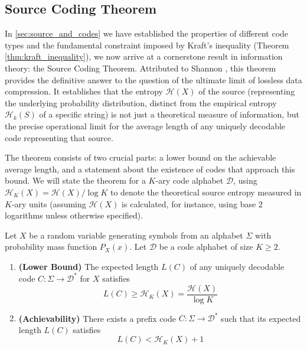 \subsection{Source Coding Theorem}

\noindent In \autoref{sec:source_and_codes} we have established the properties of different code types and the fundamental constraint imposed by Kraft's inequality (Theorem \autoref{thm:kraft_inequality}), we now arrive at a cornerstone result in information theory: the Source Coding Theorem. Attributed to Shannon \cite{Shannon1948}, this theorem provides the definitive answer to the question of the ultimate limit of lossless data compression. It establishes that the entropy $\mathcal{H}(X)$ of the source (representing the underlying probability distribution, distinct from the empirical entropy $\mathcal{H}_k(S)$ of a specific string) is not just a theoretical measure of information, but the precise operational limit for the average length of any uniquely decodable code representing that source.

\noindent The theorem consists of two crucial parts: a lower bound on the achievable average length, and a statement about the existence of codes that approach this bound. We will state the theorem for a $K$-ary code alphabet $\mathcal{D}$, using $\mathcal{H}_K(X) = \mathcal{H}(X) / \log K$ to denote the theoretical source entropy measured in $K$-ary units (assuming $\mathcal{H}(X)$ is calculated, for instance, using base 2 logarithms unless otherwise specified).

\begin{theorem}\label{thm:source_coding_theorem}
    Let $X$ be a random variable generating symbols from an alphabet $\Sigma$ with probability mass function $P_X(x)$. Let $\mathcal{D}$ be a code alphabet of size $K \ge 2$.
    \begin{enumerate}
        \item \textbf{(Lower Bound)} The expected length $L(C)$ of any uniquely decodable code $C: \Sigma \to \mathcal{D}^*$ for $X$ satisfies
              \begin{equation}\label{eq:sct_lower_bound}
                  L(C) \ge \mathcal{H}_K(X) = \frac{\mathcal{H}(X)}{\log K}
              \end{equation}
        \item \textbf{(Achievability)} There exists a prefix code $C: \Sigma \to \mathcal{D}^*$ such that its expected length $L(C)$ satisfies
              \begin{equation}\label{eq:sct_achievability}
                  L(C) < \mathcal{H}_K(X) + 1
              \end{equation}
    \end{enumerate}
\end{theorem}


